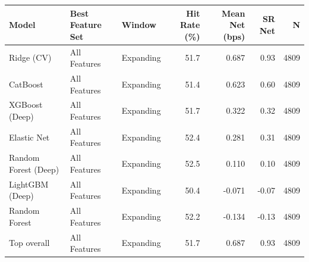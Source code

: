 \begin{tabular}{lllrrrr}
\toprule
Model & Best Feature Set & Window & Hit Rate (\%) & Mean Net (bps) & SR Net & N \\
\midrule
Ridge (CV) & All Features & Expanding & 51.7 & 0.687 & 0.93 & 4809 \\
CatBoost & All Features & Expanding & 51.4 & 0.623 & 0.60 & 4809 \\
XGBoost (Deep) & All Features & Expanding & 51.7 & 0.322 & 0.32 & 4809 \\
Elastic Net & All Features & Expanding & 52.4 & 0.281 & 0.31 & 4809 \\
Random Forest (Deep) & All Features & Expanding & 52.5 & 0.110 & 0.10 & 4809 \\
LightGBM (Deep) & All Features & Expanding & 50.4 & -0.071 & -0.07 & 4809 \\
Random Forest & All Features & Expanding & 52.2 & -0.134 & -0.13 & 4809 \\
\midrule
Top overall & All Features & Expanding & 51.7 & 0.687 & 0.93 & 4809 \\
\bottomrule
\end{tabular}
